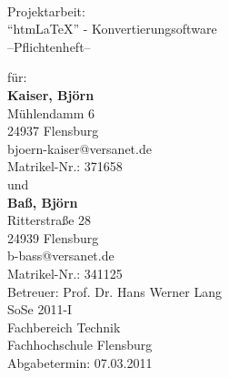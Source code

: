 \documentclass[	a4paper,		%
		titlepage, 		%
		fontsize=12pt		%
		]{scrartcl} 		%
\begin{document}
\begin{titlepage}
\centering
\resizebox*{.25\textheight}{!}{} \\
\vspace{1cm}
\Large Projektarbeit: \\ ``htm\LaTeX'' - Konvertierungsoftware\\ --Pflichtenheft--
\vspace{2cm}
\vfill
\begin{flushleft}			%
\noindent
\normalsize
für:\\ \textbf{Kaiser, Björn} \\Mühlendamm 6\\24937 Flensburg\\bjoern-kaiser@versanet.de\\ Matrikel-Nr.: 371658\\ \vspace{.5cm}
und\\ \vspace{.5cm}
\textbf{Baß, Björn} \\Ritterstraße 28\\24939 Flensburg\\b-bass@versanet.de\\ Matrikel-Nr.: 341125\\ \vspace{1cm}
\large Betreuer: Prof. Dr. Hans Werner Lang\\
SoSe 2011-I\\
Fachbereich Technik\\
Fachhochschule Flensburg\\\vspace{.5em}
Abgabetermin: 07.03.2011
\end{flushleft}
\end{titlepage}



\newpage				%



\end{document}
